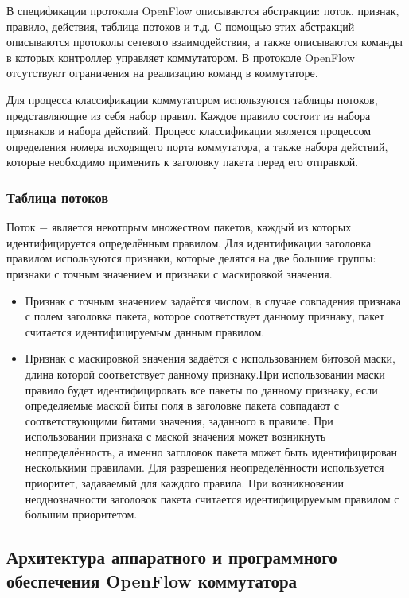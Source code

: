 \documentclass[oneside,final,12pt]{extarticle}
\begin{document}
            В спецификации протокола OpenFlow описываются абстракции: поток, признак, правило, действия, таблица потоков и т.д. С помощью этих абстракций описываются
            протоколы сетевого взаимодействия, а также описываются команды в которых контроллер управляет коммутатором. В протоколе OpenFlow отсутствуют ограничения
            на реализацию команд в коммутаторе.

            Для процесса классификации коммутатором используются таблицы потоков, представляющие из себя набор правил. Каждое правило состоит из набора признаков
            и набора действий. Процесс классификации является процессом определения номера исходящего порта коммутатора, а также набора действий, которые необходимо 
            применить к заголовку пакета перед его отправкой.
            \subsubsection{Таблица потоков}
                Поток $-$ является некоторым множеством пакетов, каждый из которых идентифицируется определённым правилом. Для идентификации заголовка правилом
                используются признаки, которые делятся на две большие группы: признаки с точным значением и признаки с маскировкой значения.
                \begin{itemize}
                    \item Признак с точным значением задаётся числом, в случае совпадения признака с полем заголовка пакета, которое соответствует данному признаку,
                        пакет считается идентифицируемым данным правилом.
                    \item Признак с маскировкой значения задаётся с использованием битовой маски, длина которой соответствует данному признаку.При использовании
                        маски правило будет идентифицировать все пакеты по данному признаку, если определяемые маской биты поля в заголовке пакета совпадают с соответствующими битами
                        значения, заданного в правиле. При использовании признака с маской значения может возникнуть неопределённость, а именно заголовок пакета может
                        быть идентифицирован несколькими правилами. Для разрешения неопределённости используется приоритет, задаваемый для каждого правила. При возникновении
                        неоднозначности заголовок пакета считается идентифицируемым правилом с большим приоритетом.
                \end{itemize}
        \subsection{Архитектура аппаратного и программного обеспечения OpenFlow коммутатора}
\end{document}
